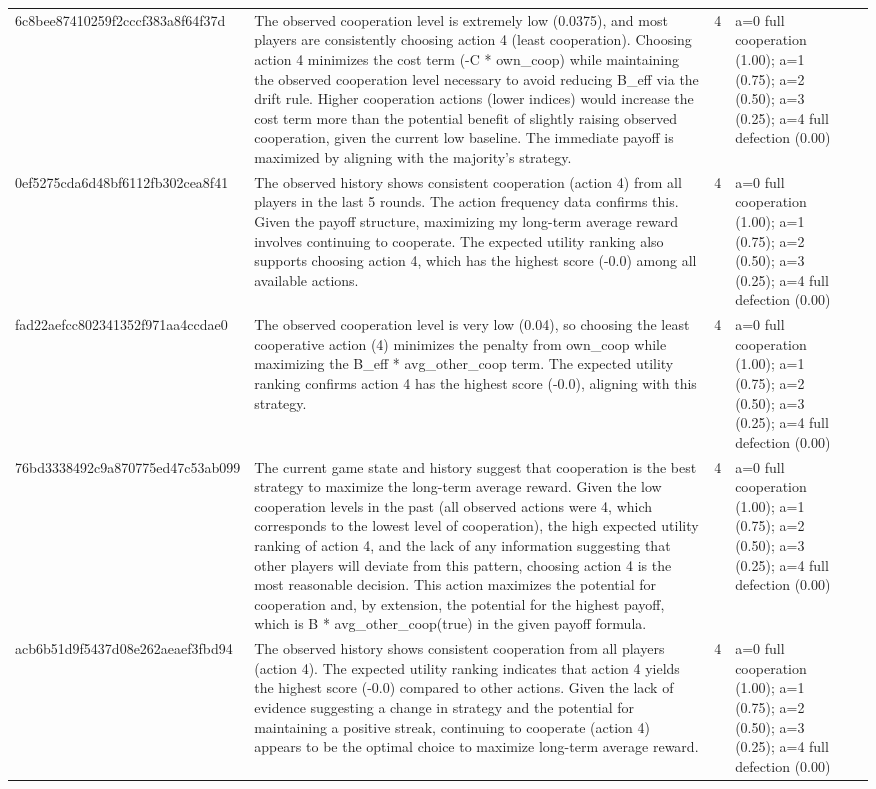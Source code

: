 \begin{tabular}{lp{8cm}ll l}
6c8bee87410259f2cccf383a8f64f37d & The observed cooperation level is extremely low (0.0375), and most players are consistently choosing action 4 (least cooperation). Choosing action 4 minimizes the cost term (-C * own\_coop) while maintaining the observed cooperation level necessary to avoid reducing B\_eff via the drift rule. Higher cooperation actions (lower indices) would increase the cost term more than the potential benefit of slightly raising observed cooperation, given the current low baseline. The immediate payoff is maximized by aligning with the majority's strategy. & 4 & a=0 full cooperation (1.00); a=1 (0.75); a=2 (0.50); a=3 (0.25); a=4 full defection (0.00) &  \\
0ef5275cda6d48bf6112fb302cea8f41 & The observed history shows consistent cooperation (action 4) from all players in the last 5 rounds. The action frequency data confirms this. Given the payoff structure, maximizing my long-term average reward involves continuing to cooperate. The expected utility ranking also supports choosing action 4, which has the highest score (-0.0) among all available actions. & 4 & a=0 full cooperation (1.00); a=1 (0.75); a=2 (0.50); a=3 (0.25); a=4 full defection (0.00) &  \\
fad22aefcc802341352f971aa4ccdae0 & The observed cooperation level is very low (0.04), so choosing the least cooperative action (4) minimizes the penalty from own\_coop while maximizing the B\_eff * avg\_other\_coop term. The expected utility ranking confirms action 4 has the highest score (-0.0), aligning with this strategy. & 4 & a=0 full cooperation (1.00); a=1 (0.75); a=2 (0.50); a=3 (0.25); a=4 full defection (0.00) &  \\
76bd3338492c9a870775ed47c53ab099 & The current game state and history suggest that cooperation is the best strategy to maximize the long-term average reward. Given the low cooperation levels in the past (all observed actions were 4, which corresponds to the lowest level of cooperation), the high expected utility ranking of action 4, and the lack of any information suggesting that other players will deviate from this pattern, choosing action 4 is the most reasonable decision. This action maximizes the potential for cooperation and, by extension, the potential for the highest payoff, which is B * avg\_other\_coop(true) in the given payoff formula. & 4 & a=0 full cooperation (1.00); a=1 (0.75); a=2 (0.50); a=3 (0.25); a=4 full defection (0.00) &  \\
acb6b51d9f5437d08e262aeaef3fbd94 & The observed history shows consistent cooperation from all players (action 4). The expected utility ranking indicates that action 4 yields the highest score (-0.0) compared to other actions. Given the lack of evidence suggesting a change in strategy and the potential for maintaining a positive streak, continuing to cooperate (action 4) appears to be the optimal choice to maximize long-term average reward. & 4 & a=0 full cooperation (1.00); a=1 (0.75); a=2 (0.50); a=3 (0.25); a=4 full defection (0.00) &  \\

\end{tabular}
